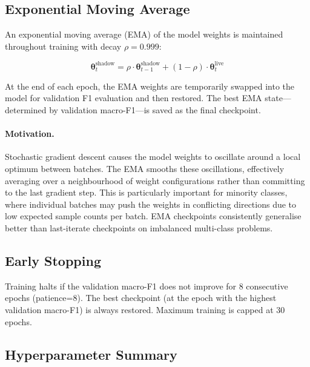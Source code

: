 \documentclass[12pt]{article}
\theoremstyle{plain}
\begin{document}
\subsection{Exponential Moving Average}

An exponential moving average (EMA) of the model weights is maintained throughout training with decay $\rho = 0.999$:

\begin{equation}
\boldsymbol{\theta}^{\text{shadow}}_{t} = \rho \cdot \boldsymbol{\theta}^{\text{shadow}}_{t-1} + (1 - \rho) \cdot \boldsymbol{\theta}^{\text{live}}_{t}
\end{equation}

At the end of each epoch, the EMA weights are temporarily swapped into the model for validation F1 evaluation and then restored. The best EMA state—determined by validation macro-F1—is saved as the final checkpoint.

\paragraph{Motivation.} Stochastic gradient descent causes the model weights to oscillate around a local optimum between batches. The EMA smooths these oscillations, effectively averaging over a neighbourhood of weight configurations rather than committing to the last gradient step. This is particularly important for minority classes, where individual batches may push the weights in conflicting directions due to low expected sample counts per batch. EMA checkpoints consistently generalise better than last-iterate checkpoints on imbalanced multi-class problems.

\subsection{Early Stopping}

Training halts if the validation macro-F1 does not improve for 8 consecutive epochs (patience=8). The best checkpoint (at the epoch with the highest validation macro-F1) is always restored. Maximum training is capped at 30 epochs.

\subsection{Hyperparameter Summary}
\end{document}
